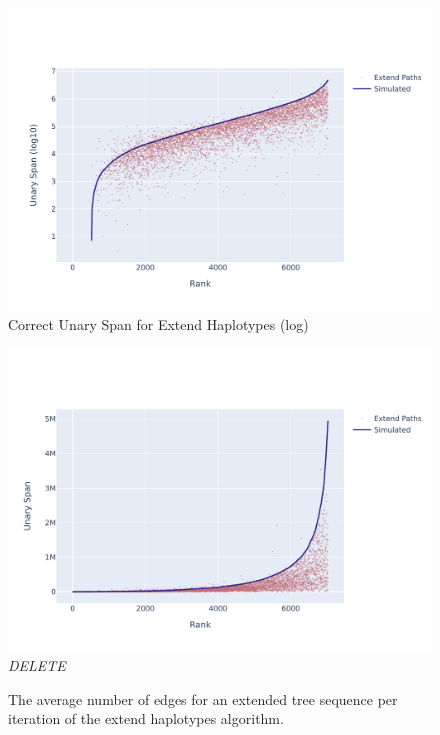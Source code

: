\documentclass[10pt,twoside,lineno]{gsajnl}
\newcommand{\comment}[1]{{\color{violet} \it #1}}
\begin{document}
\begin{figure}[bht]
	\includegraphics[width=0.9\linewidth]{newplots_wo_ee/better_unary_spans_ep_log.pdf}
	\caption{Correct Unary Span for Extend Haplotypes (log)}
	\label{fig:correct-unary-span-log}
\end{figure}

\begin{figure}
	\includegraphics[width=0.9\linewidth]{newplots_wo_ee/better_unary_spans_ep_notlog.pdf}
	\caption{\comment{DELETE}}
	\label{fig:correct-unary-span}
\end{figure}

\begin{figure}
	\caption{The average number of edges for an extended tree sequence per iteration of the extend haplotypes algorithm.}
	\label{fig:edges-per-iteration}
\end{figure}
\end{document}
